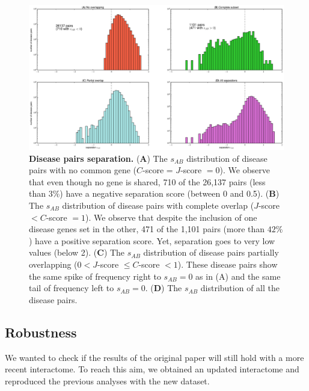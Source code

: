 \documentclass[letterpaper]{article}
\begin{document}
		\begin{figure}[!t]
			\hspace{-1.8cm}
			\vspace{-1cm}
			\includegraphics[scale=.35]{images/s_AB_histograms.eps}
			\caption{\label{fig:s_AB histogram}
			{\bf Disease pairs separation.}
			({\bf A}) The $s_{AB}$ distribution of disease pairs with no common gene ($C$-score = $J$-score $= 0$). We
			observe that even though no gene is shared, 710 of the 26,137 pairs (less than $3\%$) have a negative
			separation score (between 0 and 0.5).
			({\bf B}) The $s_{AB}$ distribution of disease pairs with complete overlap ($J$-score $< C$-score $= 1$).
			We observe that despite the inclusion of one disease genes set in the other, 471 of the 1,101 pairs
			(more than $42\%$) have a positive separation score. Yet, separation goes to very low values (below 2).
			({\bf C}) The $s_{AB}$ distribution of disease pairs partially overlapping ($0 < J$-score $ \leq C$-score $< 1$).
			These disease pairs show the same spike of frequency right to $s_{AB} = 0$ as in (A) and the same tail of frequency
			left to $s_{AB} = 0$.
			({\bf D}) The $s_{AB}$ distribution of all the disease pairs.
			}
			\vspace{-.5cm}
		\end{figure}

	\subsection{Robustness}
	We wanted to check if the results of the original paper will still hold with a more recent interactome.
	To reach this aim, we obtained an updated interactome and reproduced the previous analyses with the
	new dataset.
\end{document}

